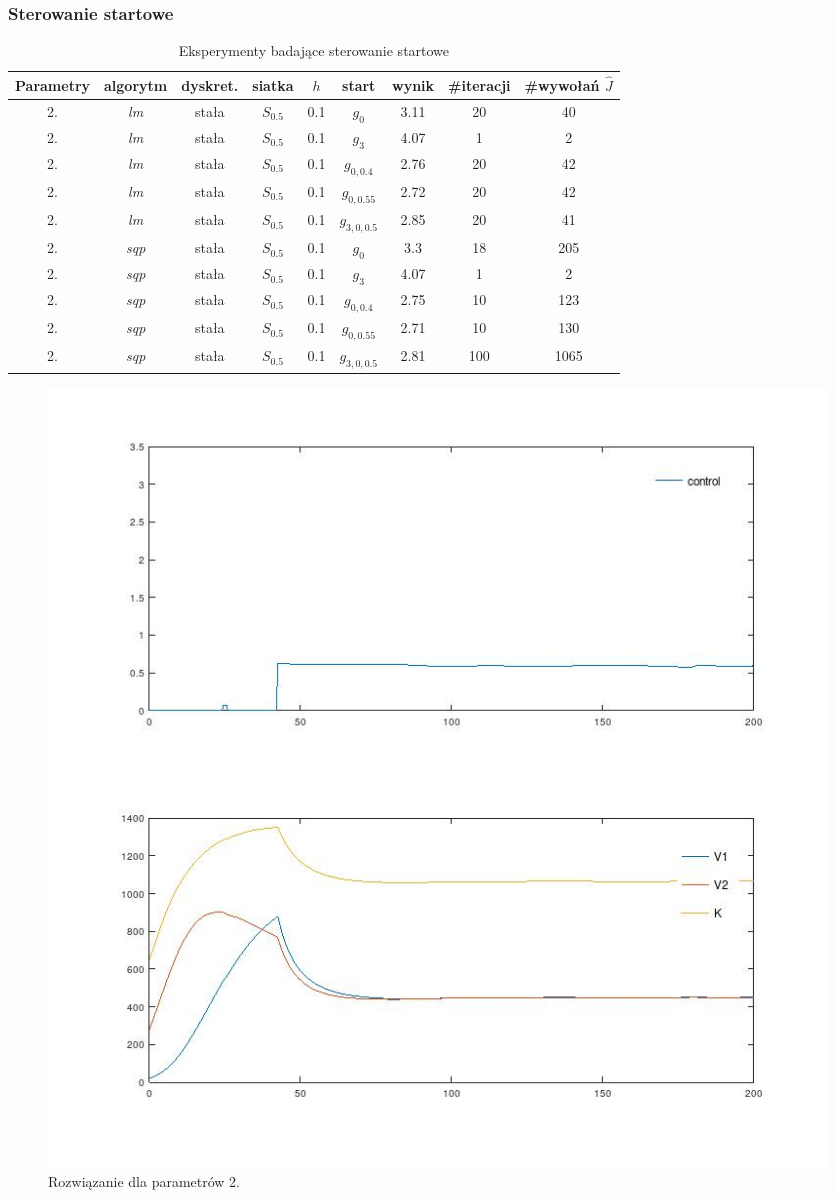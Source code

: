 \documentclass[11pt]{article}
\begin{document}
\subsubsection{Sterowanie startowe}

\begin{table}[h]
  \begin{center}
    \begin{tabular}{|c|c|c|c|c|c|c|c|c|}
      \hline
      Parametry & algorytm & dyskret. & siatka & $h$ & start & wynik & \#iteracji & \#wywołań $\hat{J}$ \\
      \hline
      2. & {\it lm\/} & stała & $S_{0.5}$ & 0.1 & $g_0$ & 3.11 & 20 & 40 \\
      \hline
      2. & {\it lm\/} & stała & $S_{0.5}$ & 0.1 & $g_3$ & 4.07 & 1 & 2 \\
      \hline
      2. & {\it lm\/} & stała & $S_{0.5}$ & 0.1 & $g_{0,0.4}$ & 2.76 & 20 & 42 \\
      \hline
      2. & {\it lm\/} & stała & $S_{0.5}$ & 0.1 & $g_{0,0.55}$ & 2.72 & 20 & 42 \\
      \hline
      2. & {\it lm\/} & stała & $S_{0.5}$ & 0.1 & $g_{3,0,0.5}$ & 2.85 & 20 & 41 \\
      \hline
      2. & {\it sqp\/} & stała & $S_{0.5}$ & 0.1 & $g_0$ & 3.3 & 18 & 205 \\
      \hline
      2. & {\it sqp\/} & stała & $S_{0.5}$ & 0.1 & $g_3$ & 4.07 & 1 & 2 \\
      \hline
      2. & {\it sqp\/} & stała & $S_{0.5}$ & 0.1 & $g_{0,0.4}$ & 2.75 & 10 & 123 \\
      \hline
      2. & {\it sqp\/} & stała & $S_{0.5}$ & 0.1 & $g_{0,0.55}$ & 2.71 & 10 & 130 \\
      \hline
      2. & {\it sqp\/} & stała & $S_{0.5}$ & 0.1 & $g_{3,0,0.5}$ & 2.81 & 100 & 1065 \\
      \hline
    \end{tabular}
    \caption{Eksperymenty badające sterowanie startowe}\label{start_tbl}
  \end{center}
\end{table}

\begin{figure}[h]
  \centering
  \includegraphics[width=.5\textwidth]{../plots/plot_param2_best}
  \caption{Rozwiązanie dla parametrów 2.}\label{param2_best_sol}
\end{figure}
\end{document}

